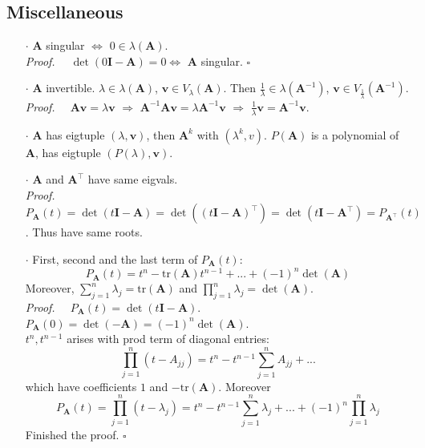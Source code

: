 \documentclass[a4paper, 11pt]{article}
\begin{document}
\subsection{Miscellaneous}
\begin{itemize}
  \item[$\cdot$] $\bm{A}$ singular $\iff$ $0\in \lambda(\bm{A})$.\\
  \textit{Proof.~~} $\det(0 \bm{I}-\bm{A})=0 \iff$ $\bm{A}$ singular. $\square$

  \item[$\cdot$] $\bm{A}$ invertible. $\lambda \in \lambda(\bm{A})$, $\bm{v}\in V_{\lambda}(\bm{A})$. Then $\frac{1}{\lambda}\in \lambda(\bm{A}^{-1})$, $\bm{v}\in V_{\frac{1}{\lambda}}(\bm{A}^{-1})$.\\
  \textit{Proof.~~} $\bm{Av}=\lambda \bm{v}$ $\Rightarrow$ $\bm{A}^{-1}\bm{Av} = \lambda \bm{A}^{-1} \bm{v}$ $\Rightarrow$ $\frac{1}{\lambda} \bm{v} = \bm{A}^{-1} \bm{v}$. 

  \item[$\cdot$] $\bm{A}$ has eigtuple $(\lambda, \bm{v})$, then $\bm{A}^k$ with $(\lambda^k, v)$. $P(\bm{A})$ is a polynomial of $\bm{A}$, has eigtuple $(P(\lambda), \bm{v})$.

  \item[$\cdot$] $\bm{A}$ and $\bm{A}^{\top}$ have same eigvals.\\
  \textit{Proof.~~} $P_{\bm{A}}(t) = \det(t\bm{I}-\bm{A}) = \det((t \bm{I}-\bm{A})^{\top}) = \det(t\bm{I} - \bm{A}^{\top}) = P_{\bm{A}^{\top}}(t)$. Thus have same roots.

  \item[$\cdot$] First, second and the last term of $P_{\bm{A}}(t)$:
  $$
  P_{\bm{A}}(t) = t^n - \text{tr}(\bm{A}) t^{n-1} + ... + (-1)^n\det(\bm{A})
  $$
  Moreover, $\sum_{j=1}^n \lambda_j = \text{tr}(\bm{A})$ and $\prod_{j=1}^n \lambda_j = \det(\bm{A})$.\\
  \textit{Proof.~~} $P_{\bm{A}}(t) = \det(t \bm{I} - \bm{A})$. \\
  $P_{\bm{A}}(0)=\det(-\bm{A})=(-1)^n\det(\bm{A})$.\\
  $t^n, t^{n-1}$ arises with prod term of diagonal entries:
  $$
  \prod_{j=1}^n(t-A_{jj}) = t^n - t^{n-1}\sum_{j=1}^n A_{jj} + ...
  $$
  which have coefficients $1$ and $-\text{tr}(\bm{A})$. Moreover
  $$
  P_{\bm{A}}(t) = \prod_{j=1}^n(t- \lambda_j) = t^n - t^{n-1}\sum_{j=1}^n \lambda_j + ... + (-1)^n \prod_{j=1}^n \lambda_j
  $$
  Finished the proof. $\square$
\end{itemize}
\end{document}
